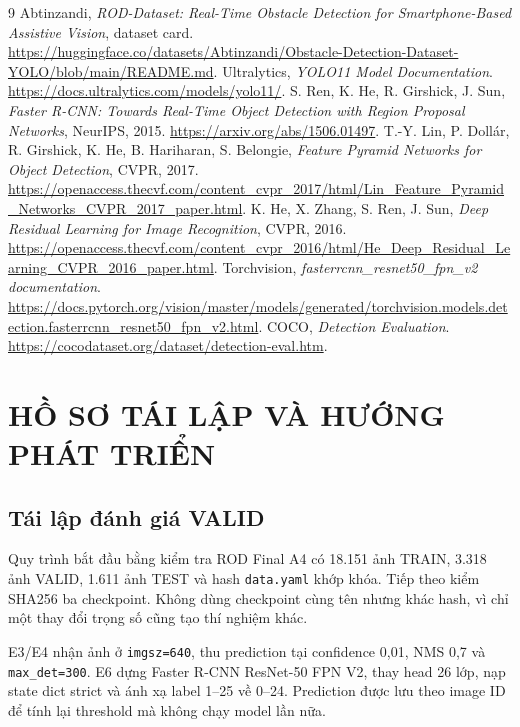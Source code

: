 \documentclass[12pt,a4paper,oneside]{report}
\begin{document}
\begin{thebibliography}{9}
 Abtinzandi, \textit{ROD-Dataset: Real-Time Obstacle Detection for Smartphone-Based Assistive Vision}, dataset card. \url{https://huggingface.co/datasets/Abtinzandi/Obstacle-Detection-Dataset-YOLO/blob/main/README.md}.
 Ultralytics, \textit{YOLO11 Model Documentation}. \url{https://docs.ultralytics.com/models/yolo11/}.
 S. Ren, K. He, R. Girshick, J. Sun, \textit{Faster R-CNN: Towards Real-Time Object Detection with Region Proposal Networks}, NeurIPS, 2015. \url{https://arxiv.org/abs/1506.01497}.
 T.-Y. Lin, P. Dollár, R. Girshick, K. He, B. Hariharan, S. Belongie, \textit{Feature Pyramid Networks for Object Detection}, CVPR, 2017. \url{https://openaccess.thecvf.com/content_cvpr_2017/html/Lin_Feature_Pyramid_Networks_CVPR_2017_paper.html}.
 K. He, X. Zhang, S. Ren, J. Sun, \textit{Deep Residual Learning for Image Recognition}, CVPR, 2016. \url{https://openaccess.thecvf.com/content_cvpr_2016/html/He_Deep_Residual_Learning_CVPR_2016_paper.html}.
 Torchvision, \textit{fasterrcnn\_resnet50\_fpn\_v2 documentation}. \url{https://docs.pytorch.org/vision/master/models/generated/torchvision.models.detection.fasterrcnn_resnet50_fpn_v2.html}.
 COCO, \textit{Detection Evaluation}. \url{https://cocodataset.org/dataset/detection-eval.htm}.
\end{thebibliography}


\appendix
\chapter{HỒ SƠ TÁI LẬP VÀ HƯỚNG PHÁT TRIỂN}
\section{Tái lập đánh giá VALID}
Quy trình bắt đầu bằng kiểm tra ROD Final A4 có 18.151 ảnh TRAIN, 3.318 ảnh VALID, 1.611 ảnh TEST và hash \texttt{data.yaml} khớp khóa. Tiếp theo kiểm SHA256 ba checkpoint. Không dùng checkpoint cùng tên nhưng khác hash, vì chỉ một thay đổi trọng số cũng tạo thí nghiệm khác.

E3/E4 nhận ảnh ở \texttt{imgsz=640}, thu prediction tại confidence 0,01, NMS 0,7 và \texttt{max\_det=300}. E6 dựng Faster R-CNN ResNet-50 FPN V2, thay head 26 lớp, nạp state dict strict và ánh xạ label 1--25 về 0--24. Prediction được lưu theo image ID để tính lại threshold mà không chạy model lần nữa.
\end{document}

